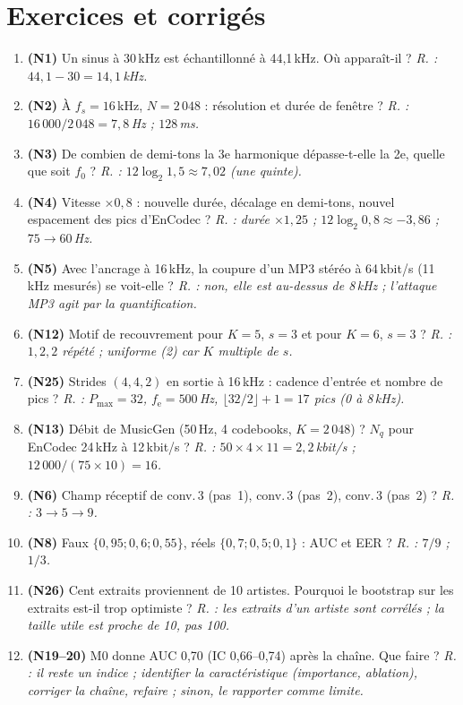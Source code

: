 \documentclass[10pt,a4paper]{article}
\begin{document}
\section{Exercices et corrigés}\label{app:exos}
\footnotesize
\begin{enumerate}[leftmargin=1.5em,itemsep=1.5pt]
  \item \textbf{(N1)} Un sinus à 30\,kHz est échantillonné à 44,1\,kHz. Où apparaît-il ? \emph{R. : $44{,}1-30=14{,}1$\,kHz.}
  \item \textbf{(N2)} À $f_s=16$\,kHz, $N=2\,048$ : résolution et durée de fenêtre ? \emph{R. : $16\,000/2\,048=7{,}8$\,Hz ; $128$\,ms.}
  \item \textbf{(N3)} De combien de demi-tons la 3e harmonique dépasse-t-elle la 2e, quelle que soit $f_0$ ? \emph{R. : $12\log_2 1{,}5\ensuremath{\approx}7{,}02$ (une quinte).}
  \item \textbf{(N4)} Vitesse $\times0{,}8$ : nouvelle durée, décalage en demi-tons, nouvel espacement des pics d'EnCodec ? \emph{R. : durée $\times1{,}25$ ; $12\log_2 0{,}8\ensuremath{\approx}-3{,}86$ ; $75\to60$\,Hz.}
  \item \textbf{(N5)} Avec l'ancrage à 16\,kHz, la coupure d'un MP3 stéréo à 64\,kbit/s (11\,kHz mesurés) se voit-elle ? \emph{R. : non, elle est au-dessus de 8\,kHz ; l'attaque MP3 agit par la quantification.}
  \item \textbf{(N12)} Motif de recouvrement pour $K=5$, $s=3$ et pour $K=6$, $s=3$ ? \emph{R. : $1,2,2$ répété ; uniforme (2) car $K$ multiple de $s$.}
  \item \textbf{(N25)} Strides $(4,4,2)$ en sortie à 16\,kHz : cadence d'entrée et nombre de pics ? \emph{R. : $P_{\max}=32$, $f_{\mathrm e}=500$\,Hz, $\lfloor32/2\rfloor+1=17$ pics (0 à 8\,kHz).}
  \item \textbf{(N13)} Débit de MusicGen (50\,Hz, 4 codebooks, $K=2\,048$) ? $N_q$ pour EnCodec 24\,kHz à 12\,kbit/s ? \emph{R. : $50\times4\times11=2{,}2$\,kbit/s ; $12\,000/(75\times10)=16$.}
  \item \textbf{(N6)} Champ réceptif de conv.\,3 (pas~1), conv.\,3 (pas~2), conv.\,3 (pas~2) ? \emph{R. : $3\to5\to9$.}
  \item \textbf{(N8)} Faux $\{0{,}95;0{,}6;0{,}55\}$, réels $\{0{,}7;0{,}5;0{,}1\}$ : AUC et EER ? \emph{R. : $7/9$ ; $1/3$.}
  \item \textbf{(N26)} Cent extraits proviennent de 10 artistes. Pourquoi le bootstrap sur les extraits est-il trop optimiste ? \emph{R. : les extraits d'un artiste sont corrélés ; la taille utile est proche de 10, pas 100.}
  \item \textbf{(N19--20)} M0 donne AUC 0,70 (IC 0,66--0,74) après la chaîne. Que faire ? \emph{R. : il reste un indice ; identifier la caractéristique (importance, ablation), corriger la chaîne, refaire ; sinon, le rapporter comme limite.}
\end{enumerate}
\normalsize
\end{document}
